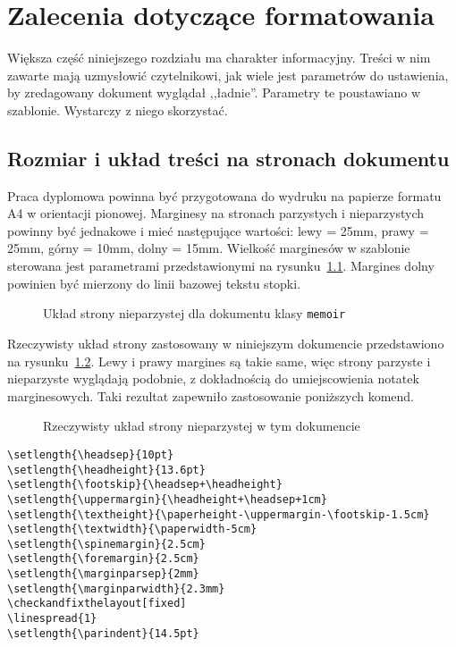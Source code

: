 \chapter{Zalecenia dotyczące formatowania}
Większa część niniejszego rozdziału ma charakter informacyjny. Treści w nim zawarte mają uzmysłowić czytelnikowi, jak wiele jest parametrów do ustawienia, by zredagowany dokument wyglądał ,,ładnie''. Parametry te poustawiano w szablonie. Wystarczy z niego skorzystać.

\section{Rozmiar i układ treści na stronach dokumentu}
Praca dyplomowa powinna być przygotowana do wydruku na papierze formatu A4 w orientacji pionowej.
Marginesy na stronach parzystych i nieparzystych powinny być jednakowe i mieć następujące wartości:
lewy = 25mm, prawy = 25mm, górny = 10mm, dolny = 15mm. Wielkość marginesów w szablonie sterowana jest parametrami przedstawionymi na rysunku~\ref{fig:pageLayout}. Margines dolny powinien być mierzony do linii bazowej tekstu stopki.
\begin{figure}[htb]
\currentpage
\drawparameterstrue
\oddpagelayoutfalse
\drawstock
\caption{Układ strony nieparzystej dla dokumentu klasy \texttt{memoir}} \label{fig:pageLayout}
\end{figure}

Rzeczywisty układ strony zastosowany w niniejszym dokumencie przedstawiono na rysunku~\ref{fig:currentPageLayout}. Lewy i prawy margines są takie same, więc strony parzyste i nieparzyste wyglądają podobnie, z dokładnością do umiejscowienia notatek marginesowych. Taki rezultat zapewniło zastosowanie poniższych komend. 
\begin{figure}[t]
\currentstock
\oddpagelayouttrue
\twocolumnlayoutfalse
\drawmarginparstrue
\drawparametersfalse
\drawstock
\caption{Rzeczywisty układ strony nieparzystej w tym dokumencie} \label{fig:currentPageLayout}
\end{figure}

\begin{lstlisting}[basicstyle=\footnotesize\ttfamily]
\setlength{\headsep}{10pt} 
\setlength{\headheight}{13.6pt} 
\setlength{\footskip}{\headsep+\headheight}
\setlength{\uppermargin}{\headheight+\headsep+1cm}
\setlength{\textheight}{\paperheight-\uppermargin-\footskip-1.5cm}
\setlength{\textwidth}{\paperwidth-5cm}
\setlength{\spinemargin}{2.5cm}
\setlength{\foremargin}{2.5cm}
\setlength{\marginparsep}{2mm}
\setlength{\marginparwidth}{2.3mm}
\checkandfixthelayout[fixed] 
\linespread{1}
\setlength{\parindent}{14.5pt}
\end{lstlisting}


